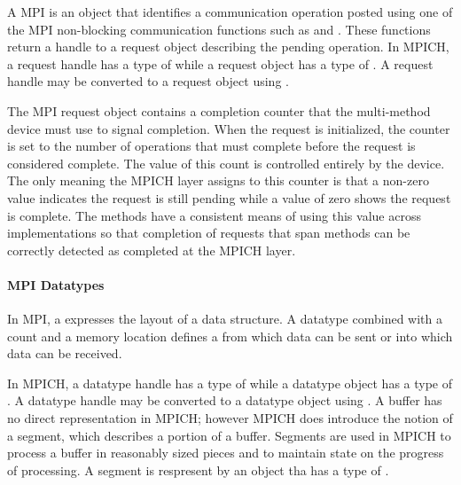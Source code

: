 A MPI  is an object that identifies a communication operation
posted using one of the MPI non-blocking communication functions such as
 and .  These functions return a handle to a
request object describing the pending operation.  In MPICH, a request handle
has a type of  while a request object has a type of
.  A request handle may be converted to a request object
using .

\begin{comment}
  Is this mapping of objects to types true for requests?  They appear to be
  treated differently that other MPI types in the design document.
\end{comment}

The MPI request object contains a completion counter that the multi-method
device must use to signal completion.  When the request is initialized, the
counter is set to the number of operations that must complete before the
request is considered complete.  The value of this count is controlled
entirely by the device.  The only meaning the MPICH layer assigns to this
counter is that a non-zero value indicates the request is still pending while
a value of zero shows the request is complete.  The methods have a consistent
means of using this value across implementations so that completion of
requests that span methods can be correctly detected as completed at the MPICH
layer.


\paragraph{MPI Datatypes}

In MPI, a  expresses the layout of a data structure.  A datatype
combined with a count and a memory location defines a  from which
data can be sent or into which data can be received.

In MPICH, a datatype handle has a type of  while a datatype
object has a type of .  A datatype handle may be converted
to a datatype object using .  A buffer has no
direct representation in MPICH; however MPICH does introduce the notion of a
segment, which describes a portion of a buffer.  Segments are used in MPICH to
process a buffer in reasonably sized pieces and to maintain state on the
progress of processing.  A segment is respresent by an object tha has a type
of .

